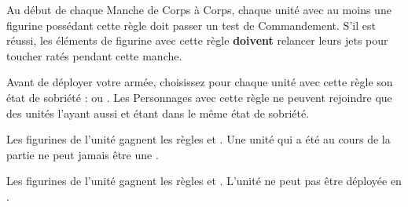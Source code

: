\newcommand{\smashrule}{%
Choisissez une figurine en contact socle à socle avec le Géant dans l'unité sélectionnée. Cette figurine subit une blessure avec \armourpiercing{6}. Si la figurine n'a pas encore attaqué, elle ne peut pas le faire au cours de cette manche. Si la figurine a déjà réalisé ses attaques, elle ne pourra pas attaquer au cours du Tour de Joueur à venir.
}


\newcommand{\QRSnote}{%
\noindent\refsymbol{} Perd le \longhorn{} quand utilisé en monture de Personnage.
}











\startarmyspecialrules

\armyspecialruleentry{\primalinstinct}

Au début de chaque Manche de Corps à Corps, chaque unité avec au moins une figurine possédant cette règle doit passer un test de Commandement. S'il est réussi, les éléments de figurine avec cette règle \textbf{doivent} relancer leurs jets pour toucher ratés pendant cette manche.

\armyspecialruleentry{\drunkard}

Avant de déployer votre armée, choisissez pour chaque unité avec cette règle son état de sobriété : \sober{} ou \drunk{}. Les Personnages avec cette règle ne peuvent rejoindre que des unités l'ayant aussi et étant dans le même état de sobriété.
\begin{multicols}{2}
	\raggedcolumns
	\begin{center}{\Largerfontsize\antiquefont\sober{}}\end{center}
	\vspace{5pt}
	\textit{}\vspace{3pt}\newline
	Les figurines de l'unité gagnent les règles \vanguard{} et \lighttroops{}. Une unité qui a été \sober{} au cours de la partie ne peut jamais être une \scoringunit{}.

	\vspace*{\fill}
	\columnbreak
	\begin{center}{\Largerfontsize\antiquefont\drunk{}}\end{center}
	\vspace{5pt}
	\textit{}\vspace{3pt}\newline
	Les figurines de l'unité gagnent les règles \thunderouscharge{} et \immunetopsychology{}. L'unité ne peut pas être déployée en \ambush{}.

	\vspace*{\fill}
\end{multicols}

